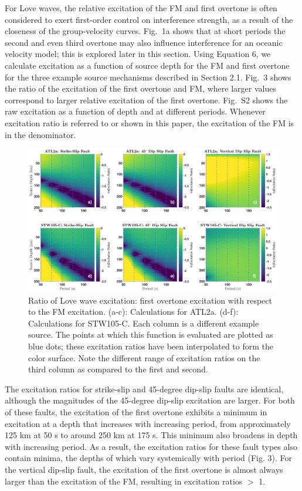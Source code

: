 \documentclass[extra,mreferee]{gji}
\begin{document}
For Love waves, the relative excitation of the FM and first overtone is often considered to exert first-order control on interference strength, as a result of the closeness of the group-velocity curves. Fig.\ 1a shows that at short periods the second and even third overtone may also influence interference for an oceanic velocity model; this is explored later in this section. Using Equation 6, we  calculate excitation as a function of source depth for the FM and first overtone for the three example source mechanisms described in Section 2.1. Fig.\ 3 shows the ratio of the excitation of the first overtone and FM, where larger values correspond to larger relative excitation of the first overtone.  Fig.\ S2 shows the raw excitation as a function of depth and at different periods. Whenever excitation ratio is referred to or shown in this paper, the excitation of the FM is in the denominator.
\begin{figure}
\includegraphics[width=1\textwidth]{Fig3.eps}
\caption{Ratio of Love wave excitation: first overtone excitation with respect to the FM excitation. (a-c): Calculations for ATL2a. (d-f): Calculations for STW105-C. Each column is a different example source. The points at which this function is evaluated are plotted as blue dots; these excitation ratios have been interpolated to form the color surface. Note the different range of excitation ratios on the third column as compared to the first and second.}
\end{figure}
The excitation ratios for strike-slip and 45-degree dip-slip faults are identical, although the magnitudes of the 45-degree dip-slip excitation are larger. For both of these faults, the excitation of the first overtone exhibits a minimum in excitation at a depth that increases with increasing period, from approximately 125 km at 50 s to around 250 km at 175 s. This minimum also broadens in depth with increasing period. As a result, the excitation ratios for these fault types also contain minima, the depths of which vary systemically with period (Fig. 3). For the vertical dip-slip fault, the excitation of the first overtone is almost always larger than the excitation of the FM, resulting in excitation ratios $>$ 1. 
\end{document}
